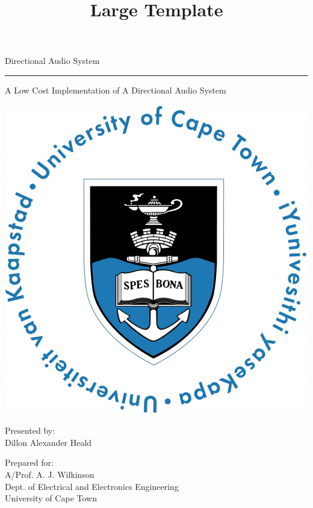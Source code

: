 \title{Large Template}

\begin{titlepage}
\begin{center}
{\Huge Directional Audio System }
\vskip 3mm
\hrule 
{\Large A Low Cost Implementation of A Directional Audio System}
\end{center}

\vskip 15mm
\begin{center}
\includegraphics[scale = 0.65]{Figures/UCT.jpg}
\end{center}

\vfill

\vskip 5mm
\begin{center}
Presented by:\\
Dillon Alexander Heald	%
\end{center}

\vskip 10mm
\begin{center}
Prepared for:\\
A/Prof. A. J. Wilkinson\\
Dept. of Electrical and Electronics Engineering\\University of Cape Town
\end{center}



\end{titlepage}
